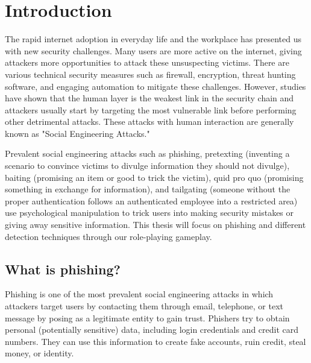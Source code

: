 

\pagestyle{plain} %
\setcounter{page}{1}


\chapter{Introduction}
The rapid internet adoption in everyday life and the workplace has presented us with new security challenges. Many users are more active on the internet, giving attackers more opportunities to attack these unsuspecting victims. There are various technical security measures such as firewall, encryption, threat hunting software, and engaging automation to mitigate these challenges. However, studies have shown that the human layer is the weakest link in the security chain \cite{jampen} and attackers usually start by targeting the most vulnerable link before performing other detrimental attacks. These attacks with human interaction are generally known as "Social Engineering Attacks."

Prevalent social engineering attacks such as phishing, pretexting (inventing a scenario to convince victims to divulge information they should not divulge), baiting (promising an item or good to trick the victim), quid pro quo (promising something in exchange for information), and tailgating (someone without the proper authentication follows an authenticated employee into a restricted area) use psychological manipulation to trick users into making security mistakes or giving away sensitive information. This thesis will focus on phishing and different detection techniques through our role-playing gameplay.

\section{What is phishing?}
Phishing is one of the most prevalent social engineering attacks in which attackers target users by contacting them through email, telephone, or text message by posing as a legitimate entity \cite{phishing, apwg} to gain trust. Phishers try to obtain personal (potentially sensitive) data, including login credentials and credit card numbers. They can use this information to create fake accounts, ruin credit, steal money, or identity.

